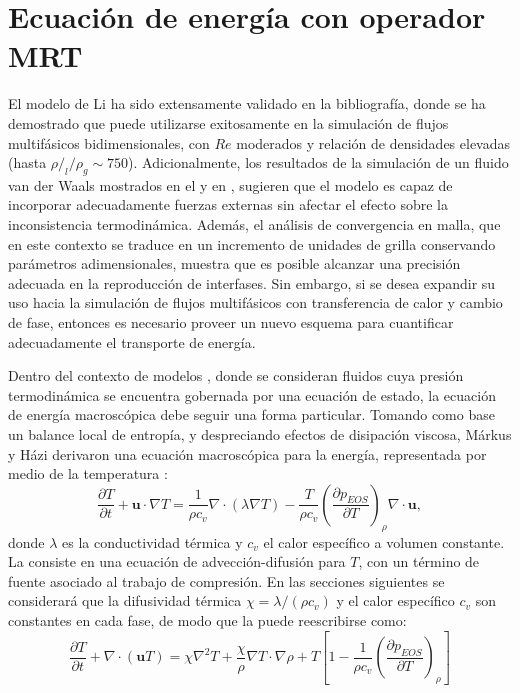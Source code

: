 \section{Ecuaci\'on de energ\'ia con operador MRT}
El modelo \pp{} de Li ha sido extensamente validado en la bibliograf\'ia, donde se ha demostrado que puede utilizarse exitosamente en la simulaci\'on de flujos multif\'asicos bidimensionales, con $Re$ moderados y relaci\'on de densidades elevadas (hasta $\rho/_l / \rho_g \sim 750$). Adicionalmente, los resultados de la simulaci\'on de un fluido van der Waals mostrados en el  y en \cite{fogliatto_simulation_2019}, sugieren que el modelo es capaz de incorporar adecuadamente fuerzas externas sin afectar el efecto sobre la inconsistencia termodin\'amica. Adem\'as, el an\'alisis de convergencia en malla, que en este contexto se traduce en un incremento de unidades de grilla conservando par\'ametros adimensionales, muestra que es posible alcanzar una precisi\'on adecuada en la reproducci\'on de interfases. Sin embargo, si se desea expandir su uso hacia la simulaci\'on de flujos multif\'asicos con transferencia de calor y cambio de fase, entonces es necesario proveer un nuevo esquema para cuantificar adecuadamente el transporte de energ\'ia.

Dentro del contexto de modelos \pp{}, donde se consideran fluidos cuya presi\'on termodin\'amica se encuentra gobernada por una ecuaci\'on de estado, la ecuaci\'on de energ\'ia macrosc\'opica debe seguir una forma particular. Tomando como base un balance local de entrop\'ia, y despreciando efectos de disipaci\'on viscosa, M\'arkus y H\'azi derivaron una ecuaci\'on macrosc\'opica para la energ\'ia, representada por medio de la temperatura \cite{markus_simulation_2011}:
\begin{equation}
	\dfrac{\partial T}{\partial t} + \bm{u} \cdot \nabla T = \dfrac{1}{\rho c_v} \nabla \cdot(\lambda \nabla T) - \dfrac{T}{\rho c_v} \left( \dfrac{\partial p_{EOS}}{\partial T} \right)_{\rho} \nabla \cdot \bm{u},
	\label{eq:markus_orig}
\end{equation}
donde $\lambda$ es la conductividad t\'ermica y $c_v$ el calor espec\'ifico a volumen constante. La  consiste en una ecuaci\'on de advecci\'on-difusi\'on para $T$, con un t\'ermino de fuente asociado al trabajo de compresi\'on. En las secciones siguientes se considerar\'a que la difusividad t\'ermica $\chi = \lambda/(\rho c_v)$ y el calor espec\'ifico $c_v$ son constantes en cada fase, de modo que la  puede reescribirse como:
\begin{equation}
	\dfrac{\partial T}{\partial t} + \nabla \cdot (\bm{u} T) = \chi \nabla^2 T  + \dfrac{\chi}{\rho} \nabla T \cdot \nabla \rho + T \left[ 1 - \dfrac{1}{\rho c_v} \left( \dfrac{\partial p_{EOS}}{\partial T} \right)_{\rho} \right]
	\label{eq:markus}
\end{equation}

